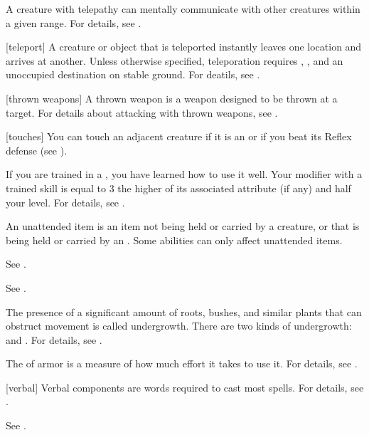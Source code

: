  A creature with telepathy can mentally communicate with other creatures within a given range.
For details, see .

[teleport] A creature or object that is teleported instantly leaves one location and arrives at another.
Unless otherwise specified, teleporation requires , , and an unoccupied destination on stable ground.
For deatils, see .

[thrown weapons] A thrown weapon is a weapon designed to be thrown at a target.
For details about attacking with thrown weapons, see .

[touches] You can touch an adjacent creature if it is an  or if you beat its Reflex defense (see ).


 If you are trained in a , you have learned how to use it well.
Your modifier with a trained skill is equal to 3 \add the higher of its associated attribute (if any) and half your level.
For details, see .

 An unattended item is an item not being held or carried by a creature, or that is being held or carried by an .
Some abilities can only affect unattended items.

 See .

 See .

 The presence of a significant amount of roots, bushes, and similar plants that can obstruct movement is called undergrowth.
There are two kinds of undergrowth:  and .
For details, see .

 The  of armor is a measure of how much effort it takes to use it.
For details, see .

[verbal] Verbal components are words required to cast most spells.
For details, see .

 See .


